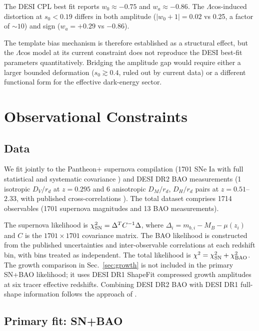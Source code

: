 \documentclass[
  aps,
  prd,
  onecolumn,         %
  nofootinbib,
  longbibliography
]{revtex4-2}
\begin{document}
The DESI CPL best fit reports $w_0 \approx -0.75$ and $w_a \approx -0.86$. The
$\Lambda$cos-induced distortion at $s_0 < 0.19$ differs in both amplitude
($|w_0+1| = 0.02$ vs 0.25, a factor of
${\sim}10$) and sign ($w_a = +0.29$ vs $-0.86$).

The template bias mechanism is therefore established as a structural effect, but the $\Lambda$cos
model at its current constraint does not reproduce the DESI best-fit
parameters quantitatively. Bridging the amplitude gap would require
either a larger bounded deformation ($s_0 \gtrsim 0.4$, ruled out by current
data) or a different functional form for the effective dark-energy
sector.

\pagebreak

\section{Observational Constraints}\label{sec:obs-constraints}

\subsection{Data}\label{sec:data}

We fit jointly to the Pantheon+ supernova compilation (1701 SNe Ia with
full statistical and systematic covariance \cite{ref2}) and DESI DR2 BAO
measurements (1 isotropic $D_V/r_d$ at $z = 0.295$ and 6 anisotropic
$D_M/r_d$, $D_H/r_d$ pairs at $z = 0.51$--$2.33$, with published
cross-correlations \cite{ref1}). The total dataset comprises 1714
observables (1701 supernova magnitudes and 13 BAO measurements).

The supernova likelihood is $\chi^2_{\rm SN} = \Delta^T C^{-1} \Delta$, where $\Delta_i = m_{b,i} - M_B - \mu(z_i)$ and $C$ is the $1701 \times 1701$ covariance matrix. The BAO
likelihood is constructed from the published uncertainties and
inter-observable correlations at each redshift bin, with bins treated as
independent. The total likelihood is $\chi^2 = \chi^2_{\rm SN} + \chi^2_{\rm BAO}$.
The growth comparison in Sec.~\ref{sec:growth} is not included in the
primary SN+BAO likelihood; it uses DESI DR1 ShapeFit compressed growth
amplitudes \cite{ref18} at six tracer effective redshifts. Combining
DESI DR2 BAO with DESI DR1 full-shape information follows the approach
of \cite{ref19,ref20}.

\subsection{Primary fit: SN+BAO}\label{sec:primary-fit}
\end{document}
